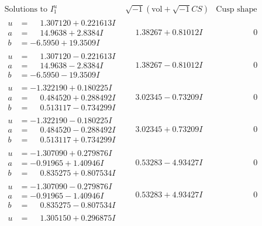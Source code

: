 \documentclass[1p]{elsarticle_modified}
\theoremstyle{definition}
\newcommand{\I}{\sqrt{-1}}
\begin{document}
$$\begin{array}{c|c|c}
\text{Solutions to }I^u_{1}& \I (\text{vol} + \sqrt{-1}CS) & \text{Cusp shape}\\
 \hline 
\begin{aligned}
u &= \phantom{-}1.307120 + 0.221613 I \\
a &= \phantom{-}14.9638 + 2.8384 I \\
b &= -6.5950 + 19.3509 I\end{aligned}
 & \phantom{-}1.38267 + 0.81012 I & \phantom{-0.000000 } 0 \\ \hline\begin{aligned}
u &= \phantom{-}1.307120 - 0.221613 I \\
a &= \phantom{-}14.9638 - 2.8384 I \\
b &= -6.5950 - 19.3509 I\end{aligned}
 & \phantom{-}1.38267 - 0.81012 I & \phantom{-0.000000 } 0 \\ \hline\begin{aligned}
u &= -1.322190 + 0.180225 I \\
a &= \phantom{-}0.484520 + 0.288492 I \\
b &= \phantom{-}0.513117 - 0.734299 I\end{aligned}
 & \phantom{-}3.02345 - 0.73209 I & \phantom{-0.000000 } 0 \\ \hline\begin{aligned}
u &= -1.322190 - 0.180225 I \\
a &= \phantom{-}0.484520 - 0.288492 I \\
b &= \phantom{-}0.513117 + 0.734299 I\end{aligned}
 & \phantom{-}3.02345 + 0.73209 I & \phantom{-0.000000 } 0 \\ \hline\begin{aligned}
u &= -1.307090 + 0.279876 I \\
a &= -0.91965 + 1.40946 I \\
b &= \phantom{-}0.835275 + 0.807534 I\end{aligned}
 & \phantom{-}0.53283 - 4.93427 I & \phantom{-0.000000 } 0 \\ \hline\begin{aligned}
u &= -1.307090 - 0.279876 I \\
a &= -0.91965 - 1.40946 I \\
b &= \phantom{-}0.835275 - 0.807534 I\end{aligned}
 & \phantom{-}0.53283 + 4.93427 I & \phantom{-0.000000 } 0 \\ \hline\begin{aligned}
u &= \phantom{-}1.305150 + 0.296875 I \\

\end{aligned}
\end{array}$$
\end{document}
